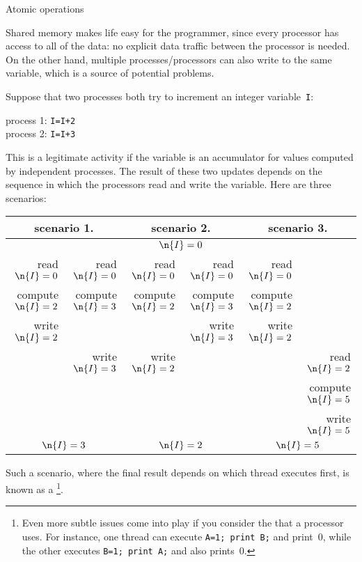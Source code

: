 
 {Atomic operations}
\label{sec:shared-lock}

Shared memory makes life easy for the programmer, since every
processor has access to all of the data: no explicit data traffic
between the processor is needed. On the other hand, multiple
processes/processors can also write to the same variable, which is a
source of potential problems.

Suppose that two processes both try to increment an integer
variable~\texttt{I}:
\begin{tabbing}
  process 1: \texttt{I=I+2}\\
  process 2: \texttt{I=I+3}
\end{tabbing}
This is a legitimate activity if the variable is an accumulator for
values computed by independent processes.
The result of these two updates
depends on the sequence in which the processors read and
write the variable. Here are three scenarios:

\begin{tabular}{|rr|rr|rr|}
  \hline
  \multicolumn{2}{|c|}{scenario 1.}& \multicolumn{2}{|c|}{scenario 2.}&
  \multicolumn{2}{|c|}{scenario 3.}\\ \hline
  \multicolumn{6}{|c|}{$\n{I}=0$}\\ \hline
  read $\n{I}=0$&read $\n{I}=0$&
    read $\n{I}=0$&read $\n{I}=0$&
      read $\n{I}=0$& \\
  compute $\n{I}=2$&compute $\n{I}=3$& 
    compute $\n{I}=2$&compute $\n{I}=3$&
      compute $\n{I}=2$& \\
  write $\n{I}=2$& & &write $\n{I}=3$&write $\n{I}=2$& \\
  &write $\n{I}=3$&write $\n{I}=2$& & &read $\n{I}=2$\\
  &&&&&compute $\n{I}=5$\\
  &&&&&write $\n{I}=5$\\
  \hline
  \multicolumn{2}{|c|}{$\n{I}=3$}& \multicolumn{2}{|c|}{$\n{I}=2$}&
  \multicolumn{2}{|c|}{$\n{I}=5$}\\ \hline
\end{tabular}
Such a scenario, where the final result depends on which thread
executes first, is known as a \footnote
{Even more subtle issues come into play if you consider
the  that a processor uses. For instance, one
thread can execute \texttt{A=1; print B;} and print~0, while the other
executes \texttt{B=1; print A;} and also prints~0.}.

